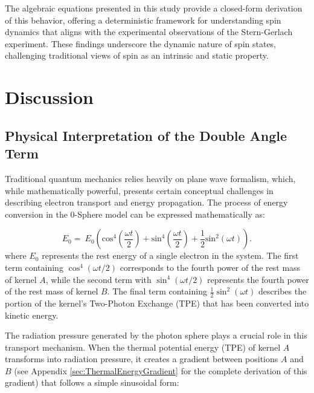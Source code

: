 \documentclass[%
 reprint,
 amsmath,amssymb,
 aps,
]{revtex4-1}
\numberwithin{equation}{section}%
\begin{document}
The algebraic equations presented in this study provide a closed-form derivation of this behavior, offering a deterministic framework for understanding spin dynamics that aligns with the experimental observations of the Stern-Gerlach experiment. These findings underscore the dynamic nature of spin states, challenging traditional views of spin as an intrinsic and static property.


\section{Discussion}
\label{sec:Discussion}

\subsection{Physical Interpretation of the Double Angle Term}
\label{PhysicalInterpretation}

Traditional quantum mechanics relies heavily on plane wave formalism, which, while mathematically powerful, presents certain conceptual challenges in describing electron transport and energy propagation. The process of energy conversion in the 0-Sphere model can be expressed mathematically as:

\begin{equation}
E_{0} = \ E_{0} \left( \mathrm{cos}^{4} \left( \frac{\omega t}{2} \right) + \mathrm{sin}^{4} \left( \frac{\omega t}{2} \right) + \frac{1}{2} \mathrm{sin}^{2} (\omega t) \right).
\label{eq:E0Conservation}
\end{equation}
where $E_0$ represents the rest energy of a single electron in the system. The first term containing $\cos^4(\omega t/2)$ corresponds to the fourth power of the rest mass of kernel $A$, while the second term with $\sin^4(\omega t/2)$ represents the fourth power of the rest mass of kernel $B$. The final term containing $\frac{1}{2}\sin^2(\omega t)$ describes the portion of the kernel's Two-Photon Exchange (TPE) that has been converted into kinetic energy.

The radiation pressure generated by the photon sphere plays a crucial role in this transport mechanism. When the thermal potential energy (TPE) of kernel $A$ transforms into radiation pressure, it creates a gradient between positions $A$ and $B$ (see Appendix \ref{sec:ThermalEnergyGradient} for the complete derivation of this gradient) that follows a simple sinusoidal form:
\end{document}
